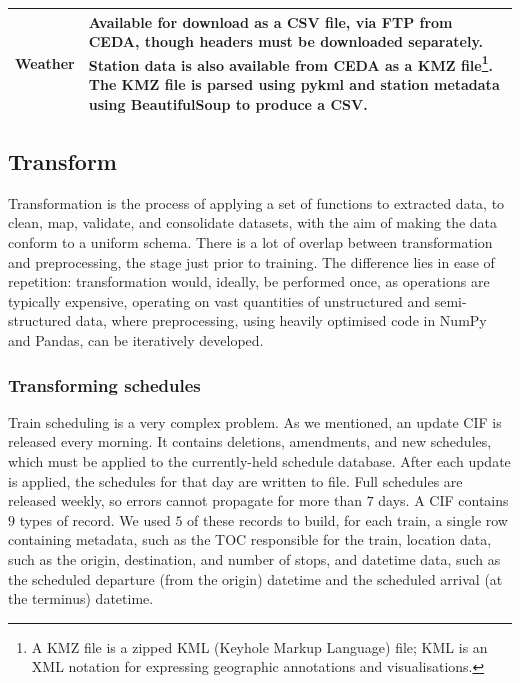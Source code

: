 \documentclass[12pt,a4paper]{article}
\begin{document}
\begin{table}[htb]
\begin{tabular}{|l|p{12cm}|}
Weather             & Available for download as a CSV file, via FTP from CEDA, though headers must be downloaded separately. Station data is also available from CEDA as a KMZ file\footnote{A KMZ file is a zipped KML (Keyhole Markup Language) file; KML is an XML notation for expressing geographic annotations and visualisations.}. The KMZ file is parsed using pykml and station metadata using BeautifulSoup to produce a CSV. \\ \hline
\end{tabular}
\end{table}

\subsection{Transform}

Transformation is the process of applying a set of functions to extracted data, to clean, map, validate, and consolidate datasets, with the aim of making the data conform to a uniform schema. There is a lot of overlap between transformation and preprocessing, the stage just prior to training. The difference lies in ease of repetition: transformation would, ideally, be performed once, as operations are typically expensive, operating on vast quantities of unstructured and semi-structured data, where preprocessing, using heavily optimised code in NumPy and Pandas, can be iteratively developed.

\subsubsection{Transforming schedules}

Train scheduling is a very complex problem. As we mentioned, an update CIF is released every morning. It contains deletions, amendments, and new schedules, which must be applied to the currently-held schedule database. After each update is applied, the schedules for that day are written to file. Full schedules are released weekly, so errors cannot propagate for more than $7$ days. A CIF contains $9$ types of record. We used $5$ of these records to build, for each train, a single row containing metadata, such as the TOC responsible for the train, location data, such as the origin, destination, and number of stops, and datetime data, such as the scheduled departure (from the origin) datetime and the scheduled arrival (at the terminus) datetime. 
\end{document}
